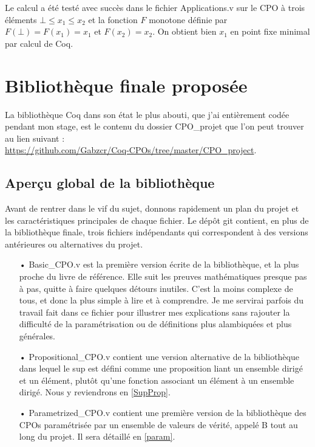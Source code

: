 \documentclass{article}
\newcommand\code[1]{{\fontfamily{lmtt}\selectfont #1}}
\theoremstyle{definition}
\begin{document}
Le calcul a été testé avec succès dans le fichier \code{Applications.v} sur le CPO à trois éléments $\bot \leq x_1 \leq x_2$ et la fonction $F$ monotone définie par $F(\bot) = F(x_1) = x_1$ et $F(x_2) = x_2$. On obtient bien $x_1$ en point fixe minimal par calcul de Coq.



\section{Bibliothèque finale proposée}

La bibliothèque Coq dans son état le plus abouti, que j'ai entièrement codée pendant mon stage, est le contenu du dossier \code{CPO\_projet} que l'on peut trouver au lien suivant :\\ \href{https://github.com/Gabzcr/Coq-CPOs/tree/master/CPO\_project}{https://github.com/Gabzcr/Coq-CPOs/tree/master/CPO\_project}.

\subsection{Aperçu global de la bibliothèque}

Avant de rentrer dans le vif du sujet, donnons rapidement un plan du projet et les caractéristiques principales de chaque fichier. Le dépôt git contient, en plus de la bibliothèque finale, trois fichiers indépendants qui correspondent à des versions antérieures ou alternatives du projet.

\medskip

\begin{itemize}
\item[•] \code{Basic\_CPO.v} est la première version écrite de la bibliothèque, et la plus proche du livre de référence. Elle suit les preuves mathématiques presque pas à pas, quitte à faire quelques détours inutiles. C'est la moins complexe de tous, et donc la plus simple à lire et à comprendre. Je me servirai parfois du travail fait dans ce fichier pour illustrer mes explications sans rajouter la difficulté de la paramétrisation ou de définitions plus alambiquées et plus générales.
\item[•] \code{Propositional\_CPO.v} contient une version alternative de la bibliothèque dans lequel le sup est défini comme une proposition liant un ensemble dirigé et un élément, plutôt qu'une fonction associant un élément à un ensemble dirigé. Nous y reviendrons en \ref{SupProp}.
\item[•] \code{Parametrized\_CPO.v} contient une première version de la bibliothèque des CPOs paramétrisée par un ensemble de valeurs de vérité, appelé \og B\fg{} tout au long du projet. Il sera détaillé en \ref{param}.
\end{itemize}
\end{document}
